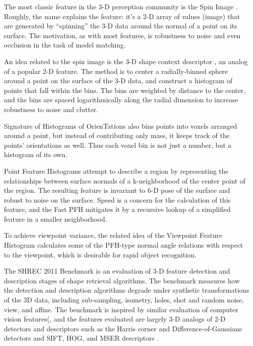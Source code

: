 The most classic feature in the 3-D perception community is the Spin Image \cite{SpinImages}.
Roughly, the name explains the feature: it's a 2-D array of values (image) that are generated by ``spinning'' the 3-D data around the normal of a point on its surface.
The motivation, as with most features, is robustness to noise and even occlusion in the task of model matching.



An idea related to the spin image is the 3-D shape context descriptor \cite{Frome2004}, an analog of a popular 2-D feature.
The method is to center a radially-binned sphere around a point on the surface of the 3-D data, and construct a histogram of points that fall within the bins.
The bins are weighted by distance to the center, and the bins are spaced logarithmically along the radial dimension to increase robustness to noise and clutter.

Signature of Histograms of OrienTations \cite{shot} also bins points into voxels arranged around a point, but instead of contributing only mass, it keeps track of the points' orientations as well.
Thus each voxel bin is not just a number, but a histogram of its own.

Point Feature Histograms \cite{pfh1} attempt to describe a region by representing the relationships between surface normals of a k-neighborhood of the center point of the region.
The resulting feature is invariant to 6-D pose of the surface and robust to noise on the surface.
Speed is a concern for the calculation of this feature, and the Fast PFH mitigates it by a recursive lookup of a simplified feature in a smaller neighborhood.

To achieve viewpoint variance, the related idea of the Viewpoint Feature Histogram \cite{Rusu2010} calculates some of the PFH-type normal angle relations with respect to the viewpoint, which is desirable for rapid object recognition.



The SHREC 2011 Benchmark \cite{Boyer2011} is an evaluation of 3-D feature detection and description stages of shape retrieval algorithms.
The benchmark measures how the detection and description algorithms degrade under synthetic transformations of the 3D data, including sub-sampling, isometry, holes, shot and random noise, view, and affine.
The benchmark is inspired by similar evaluation of computer vision features(\cite{Mikolajczyk2004,Mikolajczyk2005}, and the features evaluated are largely 3-D analogs of 2-D detectors and descriptors such as the Harris corner and Difference-of-Gaussians \cite{Harris1988,Lowe2004} detectors and SIFT, HOG, and MSER descriptors \cite{Lowe2004,Dalal2005,Matas2004}.


